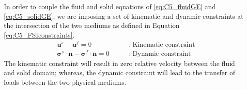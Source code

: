 In order to couple the fluid and solid equations of \eqref{eq:C5_fluidGE} and \eqref{eq:C5_solidGE}, we are imposing a set of kinematic and dynamic constraints \cite{van2007comparison} at the intersection of the two mediums as defined in Equation \eqref{eq:C5_FSIconstraints}.
%
\begin{subequations}\label{eq:C5_FSIconstraints}
\begin{align}
	\mathbf{u}^s - \mathbf{u}^f = 0
	\quad \quad &\text{: Kinematic constraint}
	\\
	\mathbf{\sigma}^s \cdot \mathbf{n} - \mathbf{\sigma}^f \cdot \mathbf{n} = 0
	\quad \quad &\text{: Dynamic constraint}
\end{align}
\end{subequations}
%
The kinematic constraint will result in zero relative velocity between the fluid and solid domain; whereas, the dynamic constraint will lead to the transfer of loads between the two physical mediums.
